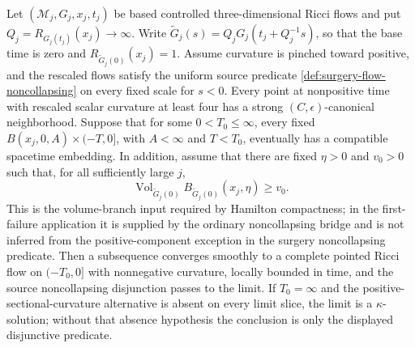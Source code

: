 \begin{theorem}
\label{thm:pointed-controlled-flow-compactness}
\notready
Let $(\mathcal M_j,G_j,x_j,t_j)$ be based controlled three-dimensional Ricci
flows and put $Q_j=R_{G_j(t_j)}(x_j)\to\infty$.  Write
$\widetilde G_j(s)=Q_jG_j(t_j+Q_j^{-1}s)$, so that the base time is zero
and $R_{\widetilde G_j(0)}(x_j)=1$.  Assume curvature is pinched toward positive, and the rescaled
flows satisfy the uniform source predicate
\ref{def:surgery-flow-noncollapsing} on every fixed scale for $s<0$.  Every
point at nonpositive time with rescaled scalar curvature at least four has a
strong $(C,\epsilon)$-canonical neighborhood.  Suppose that for some
$0<T_0\le\infty$, every fixed
$B(x_j,0,A)\times(-T,0]$, with $A<\infty$ and $T<T_0$, eventually has a
compatible spacetime embedding.  In addition, assume that there are fixed
$\eta>0$ and $v_0>0$ such that, for all sufficiently large $j$,
\[
 \operatorname{Vol}_{\widetilde G_j(0)}
 B_{\widetilde G_j(0)}(x_j,\eta)\ge v_0.
\]
This is the volume-branch input required by Hamilton compactness; in the
first-failure application it is supplied by the ordinary noncollapsing bridge
and is not inferred from the positive-component exception in the surgery
noncollapsing predicate.  Then a subsequence converges smoothly to a complete
pointed Ricci flow on $(-T_0,0]$ with nonnegative curvature, locally bounded
in time, and the source noncollapsing disjunction passes to the limit.  If
$T_0=\infty$ and the positive-sectional-curvature alternative is absent on
every limit slice, the limit is a $\kappa$-solution; without that absence
hypothesis the conclusion is only the displayed disjunctive predicate.
\end{theorem}

